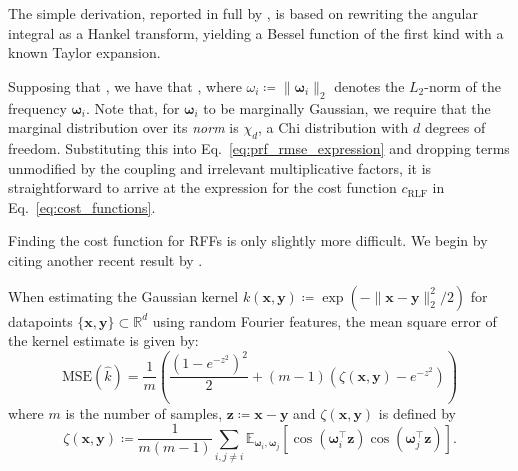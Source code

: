 The simple derivation, reported in full by \citet{simrfs}, is based on rewriting the angular integral as a Hankel transform, yielding a Bessel function of the first kind with a known Taylor expansion. 


Supposing that , we have that , where $\omega_i \coloneqq \|\boldsymbol{\omega}_i\|_2$ denotes the $L_2$-norm of the frequency $\boldsymbol{\omega}_i$.
Note that, for $\boldsymbol{\omega}_i$ to be marginally Gaussian, we require that the marginal distribution over its \emph{norm} is $\chi_d$, a Chi distribution with $d$ degrees of freedom.
Substituting this into Eq.~\ref{eq:prf_rmse_expression} and dropping terms unmodified by the coupling and irrelevant multiplicative factors, it is straightforward to arrive at the expression for the cost function $c_\textrm{RLF}$ in Eq.~\ref{eq:cost_functions}. 

Finding the cost function for RFFs is only slightly more difficult. 
We begin by citing another recent result by \citet{simrfs}. 

\begin{lemma}
When estimating the Gaussian kernel $k(\boldsymbol{x}, \boldsymbol{y}) \coloneqq \exp(- \|\boldsymbol{x} - \boldsymbol{y}\|_2^2 / 2)$ for datapoints $\{\boldsymbol{x},\boldsymbol{y}\} \subset \mathbb{R}^d$ using random Fourier features, the mean square error of the kernel estimate  is given by:
\begin{equation}
    \text{MSE}(\widehat{k})= \frac{1}{m}\left (\frac{(1-e^{-z^2})^2}{2} +  (m-1)( \zeta(\boldsymbol{x}, \boldsymbol{y}) -e^{-z^2}) \right)
\label{prf_variance_2}
\end{equation}
where $m$ is the number of samples, $\boldsymbol{z} \coloneqq \boldsymbol{x} - \boldsymbol{y}$ and $\zeta(\boldsymbol{x}, \boldsymbol{y})$ is defined by
\begin{equation}
   \zeta(\boldsymbol{x}, \boldsymbol{y}) \coloneqq \frac{1}{m(m-1)} \sum_{i, j\neq i}\mathbb{E}_{\boldsymbol{\omega}_i, \boldsymbol{\omega}_j}\left [ \cos(\boldsymbol{\omega}_i^\top \boldsymbol{z} )  \cos(\boldsymbol{\omega}_j^\top \boldsymbol{z} )  \right ].
\end{equation}    
\end{lemma}

